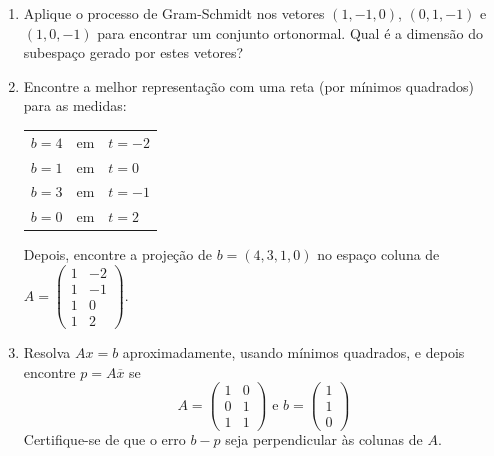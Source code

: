 \documentclass[12pt]{article}
\begin{document}
\begin{enumerate}
   \item Aplique o processo de Gram-Schmidt nos vetores $(1,-1,0)$, $(0,1,-1)$ e $(1,0,-1)$ para encontrar um conjunto ortonormal. Qual é a dimensão do subespaço gerado por estes vetores?

   \item Encontre a melhor representação com uma reta (por mínimos quadrados) para as medidas:
   \begin{tabular}{r c l}
      $b=4$ & em & $t=-2$\\
      $b=1$ & em & $t=0$\\
      $b=3$ & em & $t=-1$\\
      $b=0$ & em & $t=2$\\
   \end{tabular}
   Depois, encontre a projeção de $b=(4,3,1,0)$ no espaço coluna de $A=
   \begin{pmatrix}
      1 & -2\\
      1 & -1\\
      1 & 0\\
      1 & 2
   \end{pmatrix}$.

   \item Resolva $Ax=b$ aproximadamente, usando mínimos quadrados, e depois encontre $p=A\overline{x}$ se 
   \begin{equation*}
      A =
      \begin{pmatrix}
         1 & 0\\
         0 & 1\\
         1 & 1
      \end{pmatrix}
      \mbox{ e }
      b =
      \begin{pmatrix}
         1\\1\\0
      \end{pmatrix}
   \end{equation*}
   Certifique-se de que o erro $b-p$ seja perpendicular às colunas de $A$.

\end{enumerate}
\end{document}
